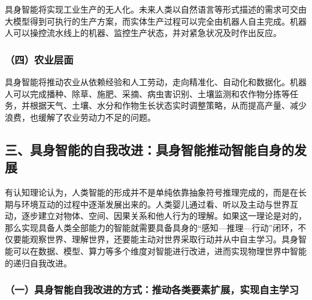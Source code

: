 具身智能将实现工业生产的无人化。未来人类以自然语言等形式描述的需求可交由大模型得到可执行的生产方案，而实体生产过程可以完全由机器人自主完成。机器人可以操控流水线上的机器、监控生产状态，并对紧急状况及时作出反应。

\hypertarget{ux56dbux519cux4e1aux5c42ux9762}{%
\subsubsection{（四）农业层面}\label{ux56dbux519cux4e1aux5c42ux9762}}

具身智能将推动农业从依赖经验和人工劳动，走向精准化、自动化和数据化。机器人可以完成播种、除草、施肥、采摘、病虫害识别、土壤监测和农作物分拣等任务，并根据天气、土壤、水分和作物生长状态实时调整策略，从而提高产量、减少浪费，也缓解了农业劳动力不足的问题。

\hypertarget{ux4e09ux5177ux8eabux667aux80fdux7684ux81eaux6211ux6539ux8fdbux5177ux8eabux667aux80fdux63a8ux52a8ux667aux80fdux81eaux8eabux7684ux53d1ux5c55}{%
\subsection{三、具身智能的自我改进：具身智能推动智能自身的发展}\label{ux4e09ux5177ux8eabux667aux80fdux7684ux81eaux6211ux6539ux8fdbux5177ux8eabux667aux80fdux63a8ux52a8ux667aux80fdux81eaux8eabux7684ux53d1ux5c55}}

有认知理论认为，人类智能的形成并不是单纯依靠抽象符号推理完成的，而是在长期与环境互动的过程中逐渐发展出来的。人类婴儿通过看、听以及主动与世界互动，逐步建立对物体、空间、因果关系和他人行为的理解。如果这一理论是对的，那么实现具备人类全部能力的智能就需要具备具身的``感知---推理---行动''闭环，不仅要能观察世界、理解世界，还要能主动对世界采取行动并从中自主学习。具身智能可以在数据、模型、算力等多个维度对智能进行改进，进而实现物理世界中智能的递归自我改进。

\hypertarget{ux4e00ux5177ux8eabux667aux80fdux81eaux6211ux6539ux8fdbux7684ux65b9ux5f0fux63a8ux52a8ux5404ux7c7bux8981ux7d20ux6269ux5c55ux5b9eux73b0ux81eaux4e3bux5b66ux4e60}{%
\subsubsection{（一）具身智能自我改进的方式：推动各类要素扩展，实现自主学习}\label{ux4e00ux5177ux8eabux667aux80fdux81eaux6211ux6539ux8fdbux7684ux65b9ux5f0fux63a8ux52a8ux5404ux7c7bux8981ux7d20ux6269ux5c55ux5b9eux73b0ux81eaux4e3bux5b66ux4e60}}

